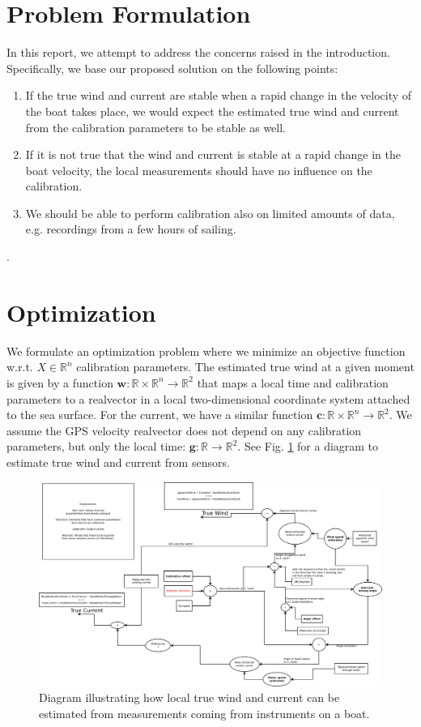\documentclass{article}
\newcommand{\realvec}[1]{\mathbf{#1}}
\newcommand{\realnumber}{\mathbb{R}}
\begin{document}
\section{Problem Formulation}
In this report, we attempt to address the concerns raised in the introduction. Specifically, we base our proposed solution on the following points:
\begin{enumerate}
 \item If the true wind and current are stable when a rapid change in the velocity of the boat takes place, we would expect the estimated true wind and current from the calibration parameters to be stable as well.
 \item If it is not true that the wind and current is stable at a rapid change in the boat velocity, the local measurements should have no influence on the calibration.
 \item We should be able to perform calibration also on limited amounts of data, e.g. recordings from a few hours of sailing.
\end{enumerate}.

\section{Optimization}
We formulate an optimization problem where we minimize an objective function w.r.t. $X \in \realnumber^n$ calibration parameters. The estimated true wind at a given moment is given by a function $\realvec{w}: \realnumber \times \realnumber^n \rightarrow \realnumber^2$ that maps a local time and calibration parameters to a realvector in a local two-dimensional coordinate system attached to the sea surface. For the current, we have a similar function $\realvec{c}: \realnumber \times \realnumber^n \rightarrow \realnumber^2$. We assume the GPS velocity realvector does not depend on any calibration parameters, but only the local time: $\realvec{g}: \realnumber \rightarrow \realnumber^2$. See Fig. \ref{fig:calib} for a diagram to estimate true wind and current from sensors.
\begin{figure}
\centering
\includegraphics[width=\textwidth]{simplecalib.pdf}
\caption{Diagram illustrating how local true wind and current can be estimated from measurements coming from instruments on a boat.}
\label{fig:calib}
\end{figure}
\end{document}
